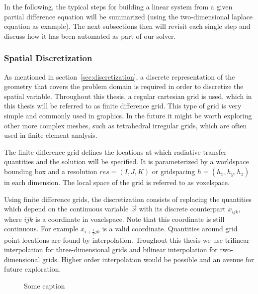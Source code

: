 In the following, the typical steps for building a linear system from a given partial difference equation will be summarized (using the two-dimensional laplace equation as example). The next subsections then will revisit each single step and discuss how it has been automated as part of our solver.

\subsubsection*{Spatial Discretization}

As mentioned in section~\ref{sec:discretization}, a discrete representation of the geometry that covers the problem domain is required in order to discretize the spatial variable. Throughout this thesis, a regular cartesian grid is used, which in this thesis will be referred to as finite difference grid. This type of grid is very simple and commonly used in graphics. In the future it might be worth exploring other more complex meshes, such as tetrahedral irregular grids, which are often used in finite element analysis. 

The finite difference grid defines the locations at which radiative transfer quantities and the solution will be specified. It is parameterized by a worldspace bounding box and a resolution $res=(I,J,K)$ or gridspacing $h=(h_x, h_y, h_z)$ in each dimension. The local space of the grid is referred to as voxelspace.

Using finite difference grids, the discretization consists of replacing the quantities which depend on the continuous variable~$\vec{x}$ with its discrete counterpart $x_{ijk}$, where $ijk$ is a coordinate in voxelspace. Note that this coordinate is still continuous. For example $x_{i+\frac{1}{2}jk}$ is a valid coordinate. Quantities around grid point locations are found by interpolation. Troughout this thesis we use trilinear interpolation for three-dimensional grids and bilinear interpolation for two-dimensional grids. Higher order interpolation would be possible and an avenue for future exploration.
\begin{figure}[h]
\centering
{}
\caption{Some caption}
\label{fig:pn_solver_finite_difference_grid}
\end{figure}

